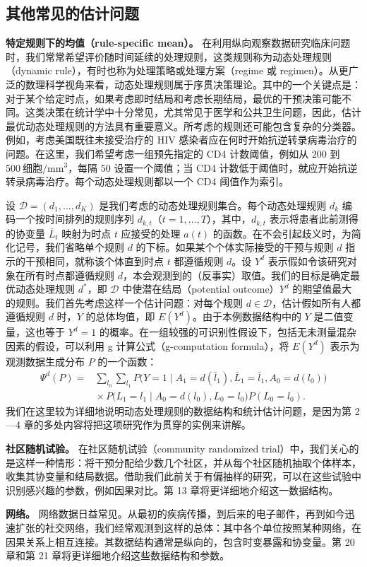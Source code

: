 \subsection{其他常见的估计问题}
\label{subsec:ch01-other-problems}

\noindent\textbf{特定规则下的均值（rule-specific mean）。}
在利用纵向观察数据研究临床问题时，我们常常希望评价随时间延续的处理规则，这类规则称为动态处理规则（dynamic rule），有时也称为处理策略或处理方案（regime 或 regimen）。从更广泛的数理科学视角来看，动态处理规则属于序贯决策理论。其中的一个关键点是：对于某个给定时点，如果考虑即时结局和考虑长期结局，最优的干预决策可能不同。这类决策在统计学中十分常见，尤其常见于医学和公共卫生问题，因此，估计最优动态处理规则的方法具有重要意义。所考虑的规则还可能包含复杂的分类器。例如，考虑美国既往未接受治疗的 HIV 感染者应在何时开始抗逆转录病毒治疗的问题。在这里，我们希望考虑一组预先指定的 CD4 计数阈值，例如从 $200$ 到 $500\ \text{细胞}/\mathrm{mm}^3$，每隔 $50$ 设置一个阈值；当 CD4 计数低于阈值时，就应开始抗逆转录病毒治疗。每个动态处理规则都以一个 CD4 阈值作为索引。

设 $\mathcal D=(d_1,\ldots,d_K)$ 是我们考虑的动态处理规则集合。每个动态处理规则 $d_k$ 编码一个按时间排列的规则序列 $d_{k,t}$（$t=1,\ldots,T$），其中，$d_{k,t}$ 表示将患者此前测得的协变量 $\bar L_t$ 映射为时点 $t$ 应接受的处理 $a(t)$ 的函数。在不会引起歧义时，为简化记号，我们省略单个规则 $d$ 的下标。如果某个个体实际接受的干预与规则 $d$ 指示的干预相同，就称该个体直到时点 $t$ 都遵循规则 $d$。设 $Y^d$ 表示假如令该研究对象在所有时点都遵循规则 $d$，本会观测到的（反事实）取值。我们的目标是确定最优动态处理规则 $d^*$，即 $\mathcal D$ 中使潜在结局（potential outcome）$Y^d$ 的期望值最大的规则。我们首先考虑这样一个估计问题：对每个规则 $d\in\mathcal D$，估计假如所有人都遵循规则 $d$ 时，$Y$ 的总体均值，即 $E(Y^d)$。由于本例数据结构中的 $Y$ 是二值变量，这也等于 $Y^d=1$ 的概率。在一组较强的可识别性假设下，包括无未测量混杂因素的假设，可以利用 g 计算公式（g-computation formula），将 $E(Y^d)$ 表示为观测数据生成分布 $P$ 的一个函数：
\[
 \begin{aligned}
 \Psi^d(P)={}&\sum_{l_0}\sum_{l_1}
 P\bigl(Y=1\mid A_1=d(\bar l_1),\bar L_1=\bar l_1,A_0=d(l_0)\bigr)\\
 &{}\times P\bigl(L_1=l_1\mid A_0=d(l_0),L_0=l_0\bigr)P(L_0=l_0).
 \end{aligned}
\]
我们在这里较为详细地说明动态处理规则的数据结构和统计估计问题，是因为第 2—4 章的多处内容将把这项研究作为贯穿的实例来讲解。

\medskip
\noindent\textbf{社区随机试验。}
在社区随机试验（community randomized trial）中，我们关心的是这样一种情形：将干预分配给少数几个社区，并从每个社区随机抽取个体样本，收集其协变量和结局数据。借助我们此前关于有偏抽样的研究，可以在这些试验中识别感兴趣的参数，例如因果对比。第 13 章将更详细地介绍这一数据结构。

\medskip
\noindent\textbf{网络。}
网络数据日益常见。从最初的疾病传播，到后来的电子邮件，再到如今迅速扩张的社交网络，我们经常观测到这样的总体：其中各个单位按照某种网络，在因果关系上相互连接。其数据结构通常是纵向的，包含时变暴露和协变量。第 20 章和第 21 章将更详细地介绍这些数据结构和参数。

